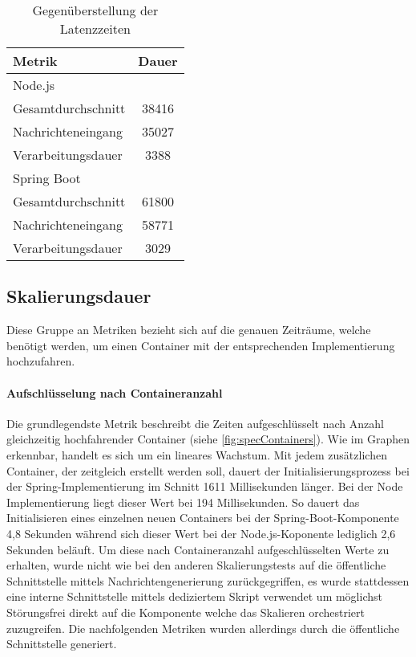\begin{table}[ht!]
	\centering
	\caption[Latenzzeit - Vergleich]{Gegenüberstellung der Latenzzeiten}
  \label{tab:latency}
  \hspace{5mm}
  \begin{tabular}{@{}lc@{}}
    \toprule
    Metrik & Dauer \\
    \midrule
    Node.js \\
    \hspace{3mm}Gesamtdurchschnitt & 38416 \\
    \hspace{3mm}Nachrichteneingang & 35027 \\
    \hspace{3mm}Verarbeitungsdauer & 3388 \\
    \midrule
    Spring Boot \\
    \hspace{3mm}Gesamtdurchschnitt & 61800 \\
    \hspace{3mm}Nachrichteneingang & 58771 \\
    \hspace{3mm}Verarbeitungsdauer & 3029 \\
    \bottomrule
  \end{tabular}
\end{table}


\subsection{Skalierungsdauer}
Diese Gruppe an Metriken bezieht sich auf die genauen Zeiträume, welche benötigt werden, um einen Container mit der entsprechenden Implementierung hochzufahren. 

\paragraph{Aufschlüsselung nach Containeranzahl}
Die grundlegendste Metrik beschreibt die Zeiten aufgeschlüsselt nach Anzahl gleichzeitig hochfahrender Container (siehe \ref{fig:specContainers}). Wie im Graphen erkennbar, handelt es sich um ein lineares Wachstum. Mit jedem zusätzlichen Container, der zeitgleich erstellt werden soll, dauert der Initialisierungsprozess bei der Spring-Implementierung im Schnitt 1611 Millisekunden länger. Bei der Node Implementierung liegt dieser Wert bei 194 Millisekunden. So dauert das Initialisieren eines einzelnen neuen Containers bei der Spring-Boot-Komponente 4,8 Sekunden während sich dieser Wert bei der Node.js-Koponente lediglich 2,6 Sekunden beläuft. Um diese nach Containeranzahl aufgeschlüsselten Werte zu erhalten, wurde nicht wie bei den anderen Skalierungstests auf die öffentliche Schnittstelle mittels Nachrichtengenerierung zurückgegriffen, es wurde stattdessen eine interne Schnittstelle mittels dediziertem Skript verwendet um möglichst Störungsfrei direkt auf die Komponente welche das Skalieren orchestriert zuzugreifen. Die nachfolgenden Metriken wurden allerdings durch die öffentliche Schnittstelle generiert.

